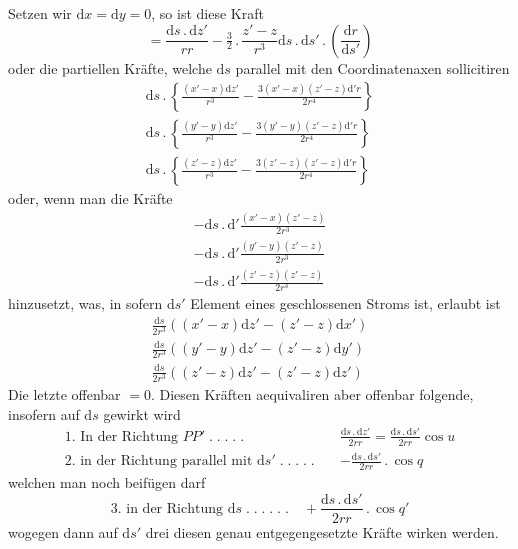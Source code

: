 Setzen wir $\mathrm dx=\mathrm dy=0$, so ist diese Kraft
\[
=\frac{\mathrm ds\,.\,\mathrm dz'}{rr}-\tfrac{3}{2}\,.\,\frac{z'-z}{r^3}\mathrm ds\,.\,\mathrm ds'\,.\,\left(\frac{\mathrm dr}{\mathrm ds'}\right)
\]
oder die partiellen Kräfte, welche $\mathrm ds$ parallel mit den Coordinatenaxen sollicitiren
\[
\begin{gathered}
\mathrm ds\,.\,\left\{\frac{(x'-x)\mathrm dz'}{r^3}-\frac{3(x'-x)(z'-z)\mathrm d'r}{2r^4}\right\}\\[4pt]
\mathrm ds\,.\,\left\{\frac{(y'-y)\mathrm dz'}{r^3}-\frac{3(y'-y)(z'-z)\mathrm d'r}{2r^4}\right\}\\[4pt]
\mathrm ds\,.\,\left\{\frac{(z'-z)\mathrm dz'}{r^3}-\frac{3(z'-z)(z'-z)\mathrm d'r}{2r^4}\right\}
\end{gathered}
\]
oder, wenn man die Kräfte
\[
\begin{gathered}
-\mathrm ds\,.\,\mathrm d'\frac{(x'-x)(z'-z)}{2r^3}\\[4pt]
-\mathrm ds\,.\,\mathrm d'\frac{(y'-y)(z'-z)}{2r^3}\\[4pt]
-\mathrm ds\,.\,\mathrm d'\frac{(z'-z)(z'-z)}{2r^3}
\end{gathered}
\]
hinzusetzt, was, in sofern $\mathrm ds'$ Element eines geschlossenen Stroms ist, erlaubt ist
\[
\begin{gathered}
\frac{\mathrm ds}{2r^3}((x'-x)\mathrm dz'-(z'-z)\mathrm dx')\\[4pt]
\frac{\mathrm ds}{2r^3}((y'-y)\mathrm dz'-(z'-z)\mathrm dy')\\[4pt]
\frac{\mathrm ds}{2r^3}((z'-z)\mathrm dz'-(z'-z)\mathrm dz')
\end{gathered}
\]
Die letzte offenbar $=0$. Diesen Kräften aequivaliren aber offenbar folgende, insofern auf $\mathrm ds$ gewirkt wird
\[
\begin{aligned}
\text{1. In der Richtung }PP'\; .\;.\;.\;.\;.\quad&\frac{\mathrm ds\,.\,\mathrm dz'}{2rr}=\frac{\mathrm ds\,.\,\mathrm ds'}{2rr}\cos u\\[4pt]
\text{2. in der Richtung parallel mit }\mathrm ds'\; .\;.\;.\;.\;.\quad&-\frac{\mathrm ds\,.\,\mathrm ds'}{2rr}\,.\,\cos q
\end{aligned}
\]
welchen man noch beifügen darf
\[
\text{3. in der Richtung }\mathrm ds\; .\;.\;.\;.\;.\;.\quad+\frac{\mathrm ds\,.\,\mathrm ds'}{2rr}\,.\,\cos q'
\]
wogegen dann auf $\mathrm ds'$ drei diesen genau entgegengesetzte Kräfte wirken werden.

